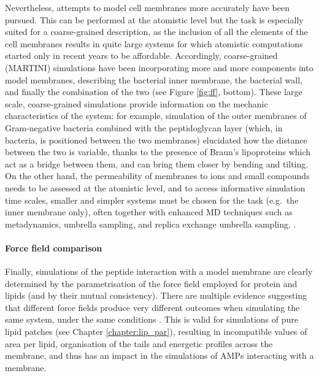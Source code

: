 
Nevertheless, attempts to model cell membranes more accurately have been pursued. This can be performed at the atomistic level \citep{Piggot2011}
but the task is especially suited for a coarse-grained description, as the inclusion of all the elements of the cell membranes results in quite large systems for which atomistic computations started only in recent years to be affordable.
%
Accordingly, coarse-grained (MARTINI) simulations have been incorporating more and more components into model membranes, describing the bacterial inner membrane, the bacterial wall, and finally the combination of the two \citep{Khalid2019} (see Figure \ref{fig:ff}, bottom).
%
These large scale, coarse-grained simulations provide information on the mechanic characteristics of the system: for example, simulation of the outer membranes of Gram-negative bacteria combined with the peptidoglycan layer (which, in bacteria, is positioned between the two membranes) elucidated how the distance between the two is variable, thanks to the presence of Braun's lipoproteins \citep{Asmar2018} which act as a bridge between them, and can bring them closer by bending and tilting.
%
On the other hand, the permeability of membranes to ions and small compounds needs to be assessed at the atomistic level, and to access informative simulation time scales, smaller and simpler systems must be chosen for the task (e.g.\ the inner membrane only), often together with enhanced MD techniques such as metadynamics, umbrella sampling, and replica exchange umbrella sampling. \citep{Sun2016,Piggot2011,Carpenter2016,Pokhrel2018}.

\paragraph{Force field comparison} Finally, simulations of the peptide interaction with a model membrane are clearly determined by the parametrisation of the force field employed for protein and lipids (and by their mutual consistency).
%
There are multiple evidence suggesting that different force fields produce very different outcomes when simulating the same system, under the same conditions \citep{Wang2014,Bennett2016,Sandoval-Perez2017}. This is valid for simulations of pure lipid patches (see Chapter \ref{chapter:lip_par}), resulting in incompatible values of area per lipid, organisation of the tails and energetic profiles across the membrane, and thus has an impact in the simulations of AMPs interacting with a membrane.

